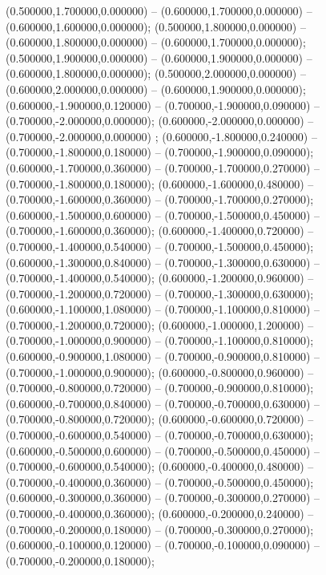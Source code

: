  (0.500000,1.700000,0.000000) -- (0.600000,1.700000,0.000000) -- (0.600000,1.600000,0.000000);
 (0.500000,1.800000,0.000000) -- (0.600000,1.800000,0.000000) -- (0.600000,1.700000,0.000000);
 (0.500000,1.900000,0.000000) -- (0.600000,1.900000,0.000000) -- (0.600000,1.800000,0.000000);
 (0.500000,2.000000,0.000000) -- (0.600000,2.000000,0.000000) -- (0.600000,1.900000,0.000000);
 (0.600000,-1.900000,0.120000) -- (0.700000,-1.900000,0.090000) -- (0.700000,-2.000000,0.000000);
 (0.600000,-2.000000,0.000000) -- (0.700000,-2.000000,0.000000) ;
 (0.600000,-1.800000,0.240000) -- (0.700000,-1.800000,0.180000) -- (0.700000,-1.900000,0.090000);
 (0.600000,-1.700000,0.360000) -- (0.700000,-1.700000,0.270000) -- (0.700000,-1.800000,0.180000);
 (0.600000,-1.600000,0.480000) -- (0.700000,-1.600000,0.360000) -- (0.700000,-1.700000,0.270000);
 (0.600000,-1.500000,0.600000) -- (0.700000,-1.500000,0.450000) -- (0.700000,-1.600000,0.360000);
 (0.600000,-1.400000,0.720000) -- (0.700000,-1.400000,0.540000) -- (0.700000,-1.500000,0.450000);
 (0.600000,-1.300000,0.840000) -- (0.700000,-1.300000,0.630000) -- (0.700000,-1.400000,0.540000);
 (0.600000,-1.200000,0.960000) -- (0.700000,-1.200000,0.720000) -- (0.700000,-1.300000,0.630000);
 (0.600000,-1.100000,1.080000) -- (0.700000,-1.100000,0.810000) -- (0.700000,-1.200000,0.720000);
 (0.600000,-1.000000,1.200000) -- (0.700000,-1.000000,0.900000) -- (0.700000,-1.100000,0.810000);
 (0.600000,-0.900000,1.080000) -- (0.700000,-0.900000,0.810000) -- (0.700000,-1.000000,0.900000);
 (0.600000,-0.800000,0.960000) -- (0.700000,-0.800000,0.720000) -- (0.700000,-0.900000,0.810000);
 (0.600000,-0.700000,0.840000) -- (0.700000,-0.700000,0.630000) -- (0.700000,-0.800000,0.720000);
 (0.600000,-0.600000,0.720000) -- (0.700000,-0.600000,0.540000) -- (0.700000,-0.700000,0.630000);
 (0.600000,-0.500000,0.600000) -- (0.700000,-0.500000,0.450000) -- (0.700000,-0.600000,0.540000);
 (0.600000,-0.400000,0.480000) -- (0.700000,-0.400000,0.360000) -- (0.700000,-0.500000,0.450000);
 (0.600000,-0.300000,0.360000) -- (0.700000,-0.300000,0.270000) -- (0.700000,-0.400000,0.360000);
 (0.600000,-0.200000,0.240000) -- (0.700000,-0.200000,0.180000) -- (0.700000,-0.300000,0.270000);
 (0.600000,-0.100000,0.120000) -- (0.700000,-0.100000,0.090000) -- (0.700000,-0.200000,0.180000);
